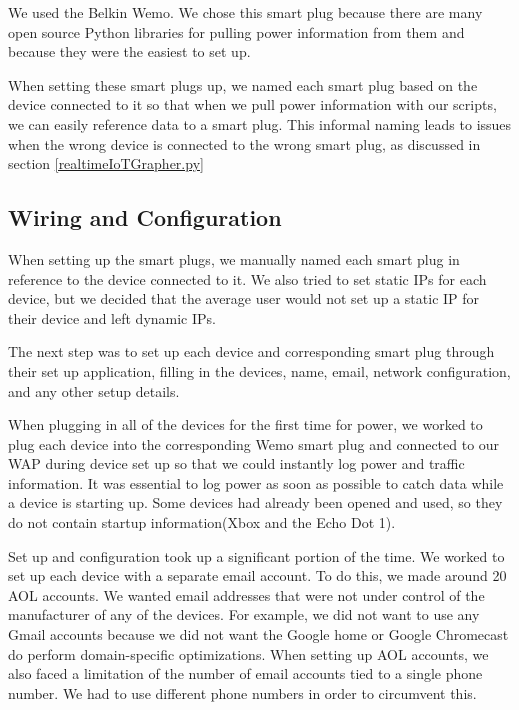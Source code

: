 We used the Belkin Wemo. We chose this smart plug because there are many open source Python libraries for pulling power information from them and because they were the easiest to set up.

When setting these smart plugs up, we named each smart plug based on the device connected to it so that when we pull power information with our scripts, we can easily reference data to a smart plug. This informal naming leads to issues when the wrong device is connected to the wrong smart plug, as discussed in section \ref{realtimeIoTGrapher.py}

\subsection{Wiring and Configuration}

When setting up the smart plugs, we manually named each smart plug in reference to the device connected to it. We also tried to set static IPs for each device, but we decided that the average user would not set up a static IP for their device and left dynamic IPs.

The next step was to set up each device and corresponding smart plug through their set up application, filling in the devices, name, email, network configuration, and any other setup details.

When plugging in all of the devices for the first time for power, we worked to plug each device into the corresponding Wemo smart plug and connected to our WAP during device set up so that we could instantly log power and traffic information. It was essential to log power as soon as possible to catch data while a device is starting up. Some devices had already been opened and used, so they do not contain startup information(Xbox and the Echo Dot 1).

Set up and configuration took up a significant portion of the time. We worked to set up each device with a separate email account. To do this, we made around 20 AOL accounts. We wanted email addresses that were not under control of the manufacturer of any of the devices. For example, we did not want to use any Gmail accounts because we did not want the Google home or Google Chromecast do perform domain-specific optimizations. When setting up AOL accounts, we also faced a limitation of the number of email accounts tied to a single phone number. We had to use different phone numbers in order to circumvent this.

